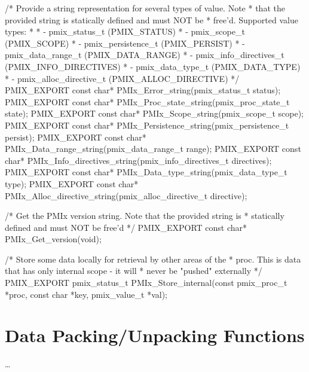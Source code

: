 \cspecificstart
\begin{codepar}
/* Provide a string representation for several types of value. Note
 * that the provided string is statically defined and must NOT be
 * free'd. Supported value types:
 *
 * - pmix_status_t (PMIX_STATUS)
 * - pmix_scope_t   (PMIX_SCOPE)
 * - pmix_persistence_t  (PMIX_PERSIST)
 * - pmix_data_range_t   (PMIX_DATA_RANGE)
 * - pmix_info_directives_t   (PMIX_INFO_DIRECTIVES)
 * - pmix_data_type_t   (PMIX_DATA_TYPE)
 * - pmix_alloc_directive_t  (PMIX_ALLOC_DIRECTIVE)
 */
PMIX_EXPORT const char* PMIx_Error_string(pmix_status_t status);
PMIX_EXPORT const char* PMIx_Proc_state_string(pmix_proc_state_t state);
PMIX_EXPORT const char* PMIx_Scope_string(pmix_scope_t scope);
PMIX_EXPORT const char* PMIx_Persistence_string(pmix_persistence_t persist);
PMIX_EXPORT const char* PMIx_Data_range_string(pmix_data_range_t range);
PMIX_EXPORT const char* PMIx_Info_directives_string(pmix_info_directives_t directives);
PMIX_EXPORT const char* PMIx_Data_type_string(pmix_data_type_t type);
PMIX_EXPORT const char* PMIx_Alloc_directive_string(pmix_alloc_directive_t directive);
\end{codepar}
\cspecificend


\cspecificstart
\begin{codepar}
/* Get the PMIx version string. Note that the provided string is
 * statically defined and must NOT be free'd  */
PMIX_EXPORT const char* PMIx_Get_version(void);
\end{codepar}
\cspecificend



\cspecificstart
\begin{codepar}
/* Store some data locally for retrieval by other areas of the
 * proc. This is data that has only internal scope - it will
 * never be "pushed" externally */
PMIX_EXPORT pmix_status_t PMIx_Store_internal(const pmix_proc_t *proc,
                                              const char *key, pmix_value_t *val);
\end{codepar}
\cspecificend


\section{Data Packing/Unpacking Functions}

\ldots

\subsection{}

